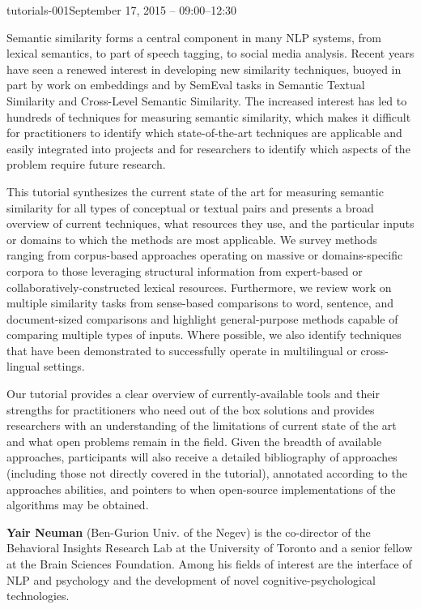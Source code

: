 \begin{tutorial}{tutorials-001}{September 17, 2015 -- 09:00--12:30}
{\TutLocA}

Semantic similarity forms a central component in many NLP systems,
from lexical semantics, to part of speech tagging, to social media
analysis. Recent years have seen a renewed interest in developing
new similarity techniques, buoyed in part by work on embeddings and
by SemEval tasks in Semantic Textual Similarity and Cross-Level Semantic
Similarity. The increased interest has led to hundreds of techniques
for measuring semantic similarity, which makes it difficult for practitioners
to identify which state-of-the-art techniques are applicable and easily
integrated into projects and for researchers to identify which aspects
of the problem require future research.

This tutorial synthesizes the current state of the art for measuring
semantic similarity for all types of conceptual or textual pairs and
presents a broad overview of current techniques, what resources they
use, and the particular inputs or domains to which the methods are
most applicable. We survey methods ranging from corpus-based approaches
operating on massive or domains-specific corpora to those leveraging
structural information from expert-based or collaboratively-constructed
lexical resources. Furthermore, we review work on multiple similarity
tasks from sense-based comparisons to word, sentence, and document-sized
comparisons and highlight general-purpose methods capable of comparing
multiple types of inputs. Where possible, we also identify techniques
that have been demonstrated to successfully operate in multilingual
or cross-lingual settings.

Our tutorial provides a clear overview of currently-available tools
and their strengths for practitioners who need out of the box solutions
and provides researchers with an understanding of the limitations
of current state of the art and what open problems remain in the field.
Given the breadth of available approaches, participants will also
receive a detailed bibliography of approaches (including those not
directly covered in the tutorial), annotated according to the approaches
abilities, and pointers to when open-source implementations of the
algorithms may be obtained.

\end{tutorial} 

\clearpage{}

\begin{bio}

\textbf{Yair Neuman} (Ben-Gurion Univ. of the Negev) is the co-director
of the Behavioral Insights Research Lab at the University of Toronto
and a senior fellow at the Brain Sciences Foundation. Among his fields
of interest are the interface of NLP and psychology and the development
of novel cognitive-psychological technologies.


\end{bio}

